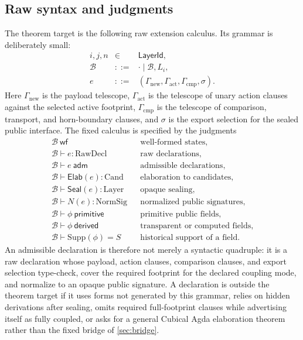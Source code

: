 \documentclass{lmcs}
\newcommand{\B}{\mathcal{B}}
\newcommand{\RawDecl}{\mathrm{RawDecl}}
\newcommand{\Cand}{\mathrm{Cand}}
\newcommand{\Layer}{\mathrm{Layer}}
\newcommand{\NormSig}{\mathrm{NormSig}}
\newcommand{\Supp}{\mathrm{Supp}}
\begin{document}
\subsection{Raw syntax and judgments}
\label{subsec:raw-syntax}

The theorem target is the following raw extension calculus. Its grammar is deliberately small:
\[
\begin{array}{rcl}
  i,j,n &\in& \mathsf{LayerId},\\
  \B   &::=& \cdot \mid \B,L_i,\\
  e    &::=& (\Gamma_{\mathrm{new}},\Gamma_{\mathrm{act}},\Gamma_{\mathrm{cmp}},\sigma).
\end{array}
\]
Here $\Gamma_{\mathrm{new}}$ is the payload telescope, $\Gamma_{\mathrm{act}}$ is the telescope of unary action clauses against the selected active footprint, $\Gamma_{\mathrm{cmp}}$ is the telescope of comparison, transport, and horn-boundary clauses, and $\sigma$ is the export selection for the sealed public interface. The fixed calculus is specified by the judgments
\[
\begin{array}{rcl}
  \B\ \mathsf{wf} && \text{well-formed states},\\
  \B \vdash e : \RawDecl && \text{raw declarations},\\
  \B \vdash e\ \mathsf{adm} && \text{admissible declarations},\\
  \B \vdash \mathsf{Elab}(e) : \Cand && \text{elaboration to candidates},\\
  \B \vdash \mathsf{Seal}(e) : \Layer && \text{opaque sealing},\\
  \B \vdash N(e) : \NormSig && \text{normalized public signatures},\\
  \B \vdash \phi\ \mathsf{primitive} && \text{primitive public fields},\\
  \B \vdash \phi\ \mathsf{derived} && \text{transparent or computed fields},\\
  \B \vdash \Supp(\phi)=S && \text{historical support of a field}.
\end{array}
\]
An admissible declaration is therefore not merely a syntactic quadruple: it is a raw declaration whose payload, action clauses, comparison clauses, and export selection type-check, cover the required footprint for the declared coupling mode, and normalize to an opaque public signature. A declaration is outside the theorem target if it uses forms not generated by this grammar, relies on hidden derivations after sealing, omits required full-footprint clauses while advertising itself as fully coupled, or asks for a general Cubical Agda elaboration theorem rather than the fixed bridge of \autoref{sec:bridge}.
\end{document}
